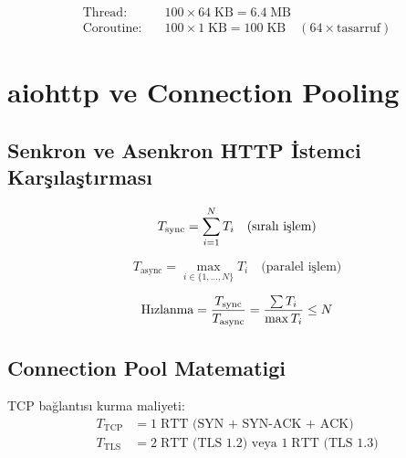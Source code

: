 \begin{formulbox}
\begin{align*}
\text{Thread:}    &\quad 100 \times 64\;\text{KB} = 6.4\;\text{MB} \\
\text{Coroutine:} &\quad 100 \times 1\;\text{KB}  = 100\;\text{KB} \quad (64\times \text{tasarruf})
\end{align*}
\end{formulbox}


\section{aiohttp ve Connection Pooling}
\label{sec:aiohttp}

\subsection{Senkron ve Asenkron HTTP \.{I}stemci Kar\c{s}{\i}la\c{s}t{\i}rmas{\i}}
\label{sec:sync-vs-async-http}

\begin{equation}
\label{eq:sync-total}
T_{\mathrm{sync}} = \sum_{i=1}^{N} T_i \quad \text{(s{\i}ral{\i} i\c{s}lem)}
\end{equation}

\begin{equation}
\label{eq:async-total}
T_{\mathrm{async}} = \max_{i \in \{1,\ldots,N\}} T_i \quad \text{(paralel i\c{s}lem)}
\end{equation}

\begin{equation}
\label{eq:speedup}
\text{H{\i}zlanma} = \frac{T_{\mathrm{sync}}}{T_{\mathrm{async}}} = \frac{\sum T_i}{\max T_i} \leq N
\end{equation}

\subsection{Connection Pool Matematigi}
\label{sec:conn-pool}

TCP ba\u{g}lant{\i}s{\i} kurma maliyeti:
\begin{align}
T_{\mathrm{TCP}} &= 1\;\text{RTT (SYN + SYN-ACK + ACK)} \\
T_{\mathrm{TLS}} &= 2\;\text{RTT (TLS 1.2) veya } 1\;\text{RTT (TLS 1.3)}
\end{align}

